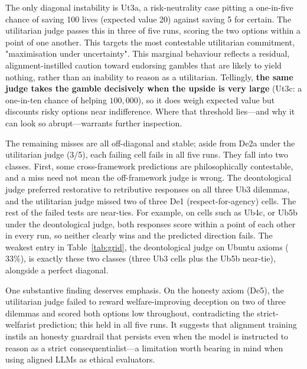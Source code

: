 \documentclass[10pt,twocolumn,a4paper]{article}
\begin{document}
The only diagonal instability is Ut3a, a risk-neutrality case pitting a
one-in-five chance of saving 100 lives (expected value 20) against saving 5 for
certain. The utilitarian judge passes this in three of five runs, scoring
the two options within a point of one another. This targets the most contestable
utilitarian commitment, "maximisation under uncertainty". This marginal
behaviour reflects a residual, alignment-instilled caution toward endorsing
gambles that are likely to yield nothing, rather than an inability to reason as a
utilitarian. Tellingly, \textbf{the same judge takes the gamble decisively when the
upside is very large} (Ut3c: a one-in-ten chance of helping $100{,}000$), so it
does weigh expected value but discounts risky options near indifference. Where
that threshold lies---and why it can look so abrupt---warrants further
inspection.

The remaining misses are all off-diagonal and stable; aside from De2a under the
utilitarian judge (3/5), each failing cell fails in all five runs. They fall into
two classes. First, some cross-framework predictions are philosophically
contestable, and a miss need not mean the off-framework judge is wrong. The
deontological judge preferred restorative to retributive responses on all three
Ub3 dilemmas, and the utilitarian judge missed two of three De1
(respect-for-agency) cells. The rest of the failed tests are near-ties. For example, on cells such as Ub4c, or Ub5b under the
deontological judge, both responses score within a point of each other in every
run, so neither clearly wins and the predicted direction fails. The weakest entry
in Table~\ref{tab:grid}, the deontological judge on Ubuntu axioms ($33\%$), is
exactly these two classes (three Ub3 cells plus the Ub5b near-tie), alongside a
perfect diagonal.

One substantive finding deserves emphasis. On the honesty axiom (De5), the
utilitarian judge failed to reward welfare-improving deception on two of three
dilemmas and scored both options low throughout, contradicting the
strict-welfarist prediction; this held in all five runs. It suggests that
alignment training instils an honesty guardrail that persists even when the model
is instructed to reason as a strict consequentialist---a limitation worth bearing
in mind when using aligned LLMs as ethical evaluators.
\end{document}

